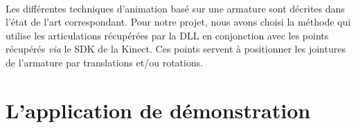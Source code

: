 \paragraph{}
Les différentes techniques d'animation basé sur une armature sont décrites dans l'état de l'art correspondant. Pour notre projet, nous avons choisi la méthode qui utilise les articulations récupérées par la DLL en conjonction avec les points récupérés \textit{via} le SDK de la Kinect. Ces points servent à positionner les jointures de l'armature par translations et/ou rotations.

\section{L'application de démonstration}